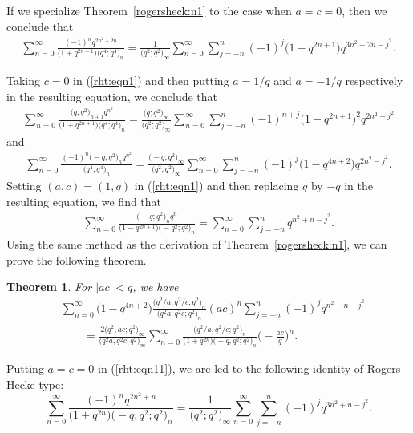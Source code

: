 \documentclass[pdftex]{sigma}
\numberwithin{equation}{section}
\newtheorem{Theorem}{Theorem}[section]
\begin{document}
If we specialize Theorem~\ref{rogersheck:n1} to the case when $a=c=0$, then we conclude that
\begin{align*}%
	\sum_{n=0}^\infty \frac{(-1)^n q^{2n^2+2n}}{\bigl(1+q^{2n+1}\bigr) \bigl(q^4; q^4\bigr)_n}
	=\frac{1}{\bigl(q^2; q^2\bigr)_\infty}\sum_{n=0}^\infty \sum_{j=-n}^n (-1)^j
	\bigl(1-q^{2n+1}\bigr) q^{3n^2+2n-j^2}.
\end{align*}


Taking $c=0$ in (\ref{rht:eqn1}) and then putting $a=1/q$ and $a=-1/q$ respectively in the resulting equation, we conclude that
\begin{align*}%
\sum_{n=0}^\infty \frac{\bigl(q; q^2\bigr)_{n+1} q^{n^2}}{\bigl(1+q^{2n+1}\bigr)\bigl(q^4; q^4\bigr)_n}
=\frac{\bigl(q; q^2\bigr)_\infty}{\bigl(q^2; q^2\bigr)_\infty}
\sum_{n=0}^\infty \sum_{j=-n}^n (-1)^{n+j} \bigl(1-q^{2n+1}\bigr)^2 q^{2n^2-j^2}
\end{align*}
and
\begin{align*}%
\sum_{n=0}^\infty \frac{(-1)^n\bigl(-q; q^2\bigr)_n q^{n^2}}{\bigl(q^4; q^4\bigr)_n}
=\frac{\bigl(-q; q^2\bigr)_\infty}{\bigl(q^2; q^2\bigr)_\infty}
\sum_{n=0}^\infty \sum_{j=-n}^n (-1)^{j} \bigl(1-q^{4n+2}\bigr) q^{2n^2-j^2}.
\end{align*}
Setting $(a, c)=(1, q)$ in (\ref{rht:eqn1}) and then replacing $q$ by $-q$ in the resulting equation, we find that~\cite[equation~(2.10)]{WangChern2019}
\begin{align*}%
\sum_{n=0}^\infty \frac{\bigl(-q; q^2\bigr)_n q^n }{\bigl(1-q^{2n+1}\bigr) \bigl(-q^2; q^2\bigr)_n}=\sum_{n=0}^\infty \sum_{j=-n}^n q^{n^2+n-j^2}.
\end{align*}
Using the same method as the derivation of Theorem~\ref{rogersheck:n1}, we can prove the following theorem.
\begin{Theorem}%
For $|ac|<q$, we have
\begin{align}
	&\sum_{n=0}^\infty \bigl(1-q^{4n+2}\bigr) \frac{\bigl(q^2/a, q^2/c; q^2\bigr)_n}{\bigl(q^2 a, q^2c; q^2\bigr)_n} (ac)^n \sum_{j=-n}^n (-1)^j q^{n^2-n-j^2}\nonumber\\
	&\qquad{}=\frac{2\bigl(q^2, ac; q^2\bigr)_\infty}{\bigl(q^2 a, q^2 c; q^2\bigr)_\infty}	\sum_{n=0}^\infty \frac{\bigl(q^2/a, q^2/c; q^2\bigr)_n}{\bigl(1+q^{2n}\bigr)\bigl(-q, q^2; q^2\bigr)_n }\biggl(-\frac{ac}{q}\biggr)^n.\label{rht:eqn11}	
\end{align}
\end{Theorem}
Putting $a=c=0$ in (\ref{rht:eqn11}), we are led to the following identity of Rogers--Hecke type:
\begin{equation*}%
\sum_{n=0}^\infty \frac{(-1)^n q^{2n^2+n}}{\bigl(1+q^{2n}\bigr)\bigl(-q, q^2; q^2\bigr)_n}
=\frac{1}{\bigl(q^2; q^2\bigr)_\infty}
\sum_{n=0}^\infty \sum_{j=-n}^n (-1)^j q^{3n^2+n-j^2}.
\end{equation*}
\end{document}
